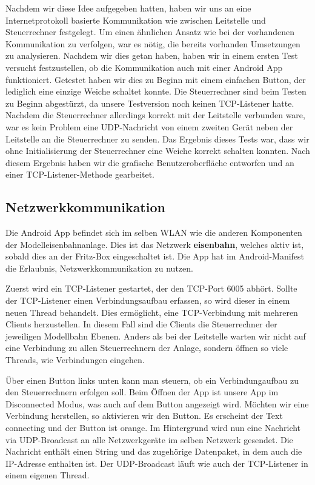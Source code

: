 \documentclass{article}
\begin{document}
Nachdem wir diese Idee aufgegeben hatten, haben wir uns an eine Internetprotokoll basierte Kommunikation wie zwischen Leitstelle und Steuerrechner festgelegt.
Um einen ähnlichen Ansatz wie bei der vorhandenen Kommunikation zu verfolgen, war es nötig, die bereits vorhanden Umsetzungen zu analysieren.
Nachdem wir dies getan haben, haben wir in einem ersten Test versucht festzustellen, ob die Kommunikation auch mit einer Android App funktioniert.
Getestet haben wir dies zu Beginn mit einem einfachen Button, der lediglich eine einzige Weiche schaltet konnte.
Die Steuerrechner sind beim Testen zu Beginn abgestürzt, da unsere Testversion noch keinen TCP-Listener hatte.
Nachdem die Steuerrechner allerdings korrekt mit der Leitstelle verbunden ware, war es kein Problem eine UDP-Nachricht von einem zweiten Gerät neben der Leitstelle an die Steuerrechner zu senden.
Das Ergebnis dieses Tests war, dass wir ohne Initialisierung der Steuerrechner eine Weiche korrekt schalten konnten.
Nach diesem Ergebnis haben wir die grafische Benutzeroberfläche entworfen und an einer TCP-Listener-Methode gearbeitet.

\subsection{Netzwerkkommunikation}
Die Android App befindet sich im selben WLAN wie die anderen Komponenten der Modelleisenbahnanlage.
Dies ist das Netzwerk \textbf{eisenbahn}, welches aktiv ist, sobald dies an der Fritz-Box eingeschaltet ist.
Die App hat im Android-Manifest die Erlaubnis, Netzwerkkommunikation zu nutzen.

Zuerst wird ein TCP-Listener gestartet, der den TCP-Port 6005 abhört.
Sollte der TCP-Listener einen Verbindungsaufbau erfassen, so wird dieser in einem neuen Thread behandelt.
Dies ermöglicht, eine TCP-Verbindung mit mehreren Clients herzustellen.
In diesem Fall sind die Clients die Steuerrechner der jeweiligen Modellbahn Ebenen.
Anders als bei der Leitstelle warten wir nicht auf eine Verbindung zu allen Steuerrechnern der Anlage, sondern öffnen so viele Threads, wie Verbindungen eingehen.

Über einen Button links unten kann man steuern, ob ein Verbindungaufbau zu den Steuerrechnern erfolgen soll.
Beim Öffnen der App ist unsere App im Disconnected Modus, was auch auf dem Button angezeigt wird.
Möchten wir eine Verbindung herstellen, so aktivieren wir den Button.
Es erscheint der Text connecting und der Button ist orange.
Im Hintergrund wird nun eine Nachricht via UDP-Broadcast an alle Netzwerkgeräte im selben Netzwerk gesendet.
Die Nachricht enthält einen String und das zugehörige Datenpaket, in dem auch die IP-Adresse enthalten ist.
Der UDP-Broadcast läuft wie auch der TCP-Listener in einem eigenen Thread.
\end{document}
